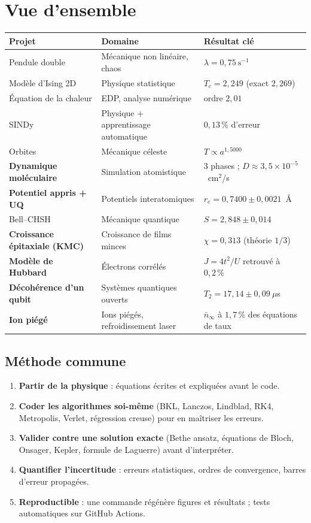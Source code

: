 \documentclass[11pt,a4paper]{article}
\begin{document}
\section*{Vue d'ensemble}
\begin{tabularx}{\linewidth}{@{}l X l@{}}
\toprule
\textbf{Projet} & \textbf{Domaine} & \textbf{Résultat clé}\\
\midrule
Pendule double & Mécanique non linéaire, chaos & $\lambda = 0{,}75~\mathrm{s^{-1}}$\\
Modèle d'Ising 2D & Physique statistique & $T_c = 2{,}249$ (exact $2{,}269$)\\
Équation de la chaleur & EDP, analyse numérique & ordre $2{,}01$\\
SINDy & Physique + apprentissage automatique & $0{,}13\,\%$ d'erreur\\
Orbites & Mécanique céleste & $T \propto a^{1{,}5000}$\\
\textbf{Dynamique moléculaire} & Simulation atomistique & 3 phases ; $D \approx 3{,}5\times10^{-5}$~cm$^2$/s\\
\textbf{Potentiel appris + UQ} & Potentiels interatomiques & $r_e = 0{,}7400 \pm 0{,}0021$~Å\\
Bell--CHSH & Mécanique quantique & $S = 2{,}848 \pm 0{,}014$\\
\textbf{Croissance épitaxiale (KMC)} & Croissance de films minces & $\chi = 0{,}313$ (théorie $1/3$)\\
\textbf{Modèle de Hubbard} & Électrons corrélés & $J = 4t^2/U$ retrouvé à $0{,}2\,\%$\\
\textbf{Décohérence d'un qubit} & Systèmes quantiques ouverts & $T_2 = 17{,}14 \pm 0{,}09~\mu$s\\
\textbf{Ion piégé} & Ions piégés, refroidissement laser & $\bar n_\infty$ à $1{,}7\,\%$ des équations de taux\\
\bottomrule
\end{tabularx}

\subsection*{Méthode commune}
\begin{enumerate}
  \item \textbf{Partir de la physique} : équations écrites et expliquées avant le code.
  \item \textbf{Coder les algorithmes soi-même} (BKL, Lanczos, Lindblad, RK4, Metropolis, Verlet, régression creuse) pour en maîtriser les erreurs.
  \item \textbf{Valider contre une solution exacte} (Bethe ansatz, équations de Bloch, Onsager, Kepler, formule de Laguerre) avant d'interpréter.
  \item \textbf{Quantifier l'incertitude} : erreurs statistiques, ordres de convergence, barres d'erreur propagées.
  \item \textbf{Reproductible} : une commande régénère figures et résultats ; tests automatiques sur GitHub Actions.
\end{enumerate}
\end{document}

